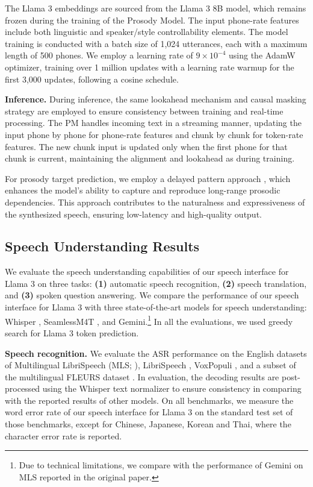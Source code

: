 \documentclass[dvipsnames]{fairmeta}
\begin{document}
The Llama 3 embeddings are sourced from the Llama 3 8B model, which remains frozen during the training of the Prosody Model. The input phone-rate features include both linguistic and speaker/style controllability elements. The model training is conducted with a batch size of 1,024 utterances, each with a maximum length of 500 phones. We employ a learning rate of \(9 \times 10^{-4}\) using the AdamW optimizer, training over 1 million updates with a learning rate warmup for the first 3,000 updates, following a cosine schedule.

\textbf{Inference.} During inference, the same lookahead mechanism and causal masking strategy are employed to ensure consistency between training and real-time processing. The PM handles incoming text in a streaming manner, updating the input phone by phone for phone-rate features and chunk by chunk for token-rate features. The new chunk input is updated only when the first phone for that chunk is current, maintaining the alignment and lookahead as during training.

For prosody target prediction, we employ a delayed pattern approach \citep{kharitonov2021text}, which enhances the model’s ability to capture and reproduce long-range prosodic dependencies. This approach contributes to the naturalness and expressiveness of the synthesized speech, ensuring low-latency and high-quality output.

\subsection{Speech Understanding Results}
\label{section:results_speech}
We evaluate the speech understanding capabilities of our speech interface for Llama 3 on three tasks: \textbf{(1)} automatic speech recognition, \textbf{(2)} speech translation, and \textbf{(3)} spoken question answering.
We compare the performance of our speech interface for Llama 3 with three state-of-the-art models for speech understanding: Whisper \citep{radford23whisper}, SeamlessM4T \citep{barrault2023seamless}, and Gemini.\footnote{
	Due to technical limitations, we compare with the performance of Gemini on MLS reported in the original paper.
}
In all the evaluations, we used greedy search for Llama 3 token prediction.

\textbf{Speech recognition.}
We evaluate the ASR performance on the
English datasets of
Multilingual LibriSpeech (MLS; \citet{pratap2020mls}),
LibriSpeech \citep{panayotov2015librispeech},
VoxPopuli \citep{wang2021voxpopuli},
and a subset of the multilingual FLEURS dataset \citep{conneau2023fleurs}.
In evaluation, the decoding results are post-processed using the Whisper text normalizer to ensure consistency in comparing with the reported results of other models.
On all benchmarks, we measure the word error rate of our speech interface for Llama 3 on the standard test set of those benchmarks, except for Chinese, Japanese, Korean and Thai, where the character error rate is reported.
\end{document}
